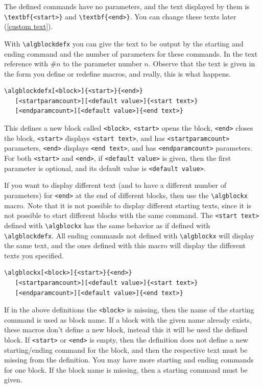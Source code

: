 \documentclass{article}
\begin{document}
\begin{minipage}[b]{0.5\linewidth}
\begin{minipage}[b]{0.5\linewidth}
\begin{minipage}[b]{0.5\linewidth}
\begin{minipage}[b]{0.5\linewidth}
\begin{minipage}[b]{0.5\linewidth}
\begin{minipage}[b]{0.5\linewidth}
\begin{minipage}[b]{0.5\linewidth}
The defined commands have no parameters, and the text displayed by them is
\verb:\textbf{<start>}: and \verb:\textbf{<end>}:. You can change these texts later
(\ref{custom text}). 

With \verb:\algblockdefx: you can give the text to be output by the starting
and ending command and the number of parameters for these commands. In the text
reference with \#$n$ to the parameter number $n$. Observe that the text
is given in the form you define or redefine macros, and really, this is what happens.

\begin{verbatim}
\algblockdefx[<block>]{<start>}{<end>}
   [<startparamcount>][<default value>]{<start text>}
   [<endparamcount>][<default value>]{<end text>}
\end{verbatim}

This defines a new block called \verb:<block>:, \verb:<start>: opens the block, 
\verb:<end>: closes the block,
\verb:<start>: displays \verb:<start text>:, and has \verb:<startparamcount>: parameters,
\verb:<end>: displays \verb:<end text>:, and has \verb:<endparamcount>: parameters. 
For both \verb:<start>: and \verb:<end>:, if
\verb:<default value>: is given, then the first parameter is optional, and its default value
is \verb:<default value>:.

If you want to display different text (and to have a different number of parameters)
for \verb:<end>: at the end of different blocks, then use
the \verb:\algblockx: macro. Note that it is not possible to display different starting texts,
since it is not possible to start different blocks with the same command. The \verb:<start text>:
defined with \verb:\algblockx: has the same behavior as if defined with \verb:\algblockdefx:. All ending commands
not defined with \verb:\algblockx: will display the same text, and the ones defined with this
macro will display the different texts you specified.

\begin{verbatim}
\algblockx[<block>]{<start>}{<end>}
   [<startparamcount>][<default value>]{<start text>}
   [<endparamcount>][<default value>]{<end text>}
\end{verbatim}

If in the above definitions the \verb:<block>: is missing, then the name of the starting command
is used as block name. If a block with the given name
already exists, these macros don't define a new block, instead this it will be used the defined 
block. If \verb:<start>: or \verb:<end>: is empty, then
the definition does not define a new starting/ending command for the block, and then the
respective text must be missing from the definition. You may have more starting and ending commands
for one block. If the block name is missing, then a starting command must be given.


\end{minipage}
\end{minipage}
\end{minipage}
\end{minipage}
\end{minipage}
\end{minipage}
\end{minipage}
\end{document}
